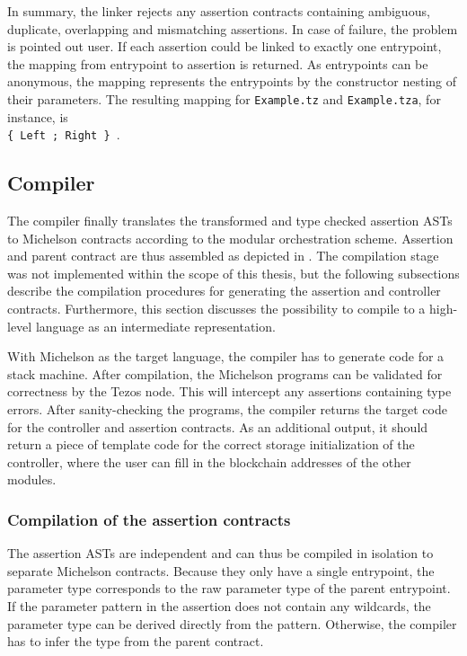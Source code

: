 In summary, the linker rejects any assertion contracts containing ambiguous, duplicate, overlapping and mismatching assertions. In case of failure, the problem is pointed out user. If each assertion could be linked to exactly one entrypoint, the mapping from entrypoint to assertion is returned. As entrypoints can be anonymous, the mapping represents the entrypoints by the constructor nesting of their parameters. The resulting mapping for \texttt{Example.tz} and \texttt{Example.tza}, for instance, is \\
\texttt{\{ Left ; Right \} }.

\subsection{Compiler}\label{sec:compiler}
The compiler finally translates the transformed and type checked assertion ASTs to Michelson contracts according to the modular orchestration scheme. Assertion and parent contract are thus assembled as depicted in . The compilation stage was not implemented within the scope of this thesis, but the following subsections describe the compilation procedures for generating the assertion and controller contracts. Furthermore, this section discusses the possibility to compile to a high-level language as an intermediate representation.

With Michelson as the target language, the compiler has to generate code for a stack machine. After compilation, the Michelson programs can be validated for correctness by the Tezos node. This will intercept any assertions containing type errors. After sanity-checking the programs, the compiler returns the target code for the controller and assertion contracts. As an additional output, it should return a piece of template code for the correct storage initialization of the controller, where the user can fill in the blockchain addresses of the other modules.

\subsubsection{Compilation of the assertion contracts}
The assertion ASTs are independent and can thus be compiled in isolation to separate Michelson contracts. Because they only have a single entrypoint, the parameter type corresponds to the raw parameter type of the parent entrypoint. If the parameter pattern in the assertion does not contain any wildcards, the parameter type can be derived directly from the pattern. Otherwise, the compiler has to infer the type from the parent contract.

